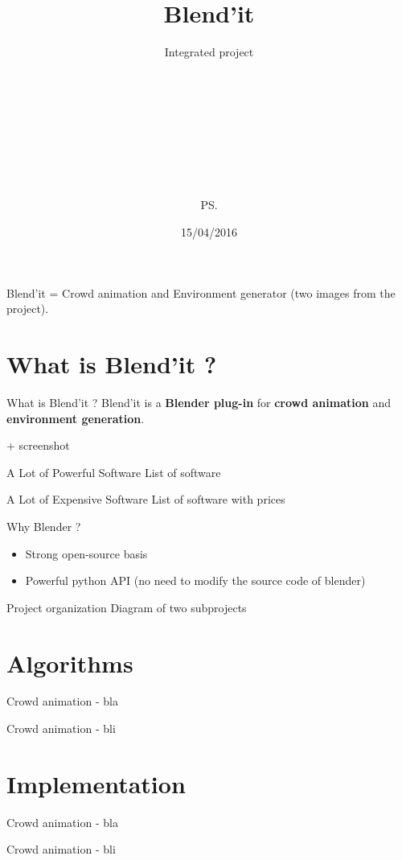 \documentclass{beamer}
\title{Blend'it}
\subtitle{Integrated project}
\author{\bb\\ \gc\\ \dl\\ \vl\\ \om\\ \mr\\ \me\\ \js\\ \ps\\}
\date{15/04/2016}
\begin{document}
\maketitle

\bgroup
{}
\begin{frame}[plain]{}
\end{frame}
\egroup

\begin{frame}{}
  Blend'it = Crowd animation and Environment generator (two images from the project).
\end{frame}

\section{What is Blend'it ?}
\begin{frame}{What is Blend'it ?}
  Blend'it is a \textbf{Blender plug-in} for \textbf{crowd animation} and \textbf{environment generation}.
  
  + screenshot
\end{frame}

\begin{frame}{A Lot of Powerful Software}
  List of software
\end{frame}

\begin{frame}{A Lot of Expensive Software}
  List of software with prices
\end{frame}

\begin{frame}{Why Blender ?}
  \begin{itemize}
    \item Strong open-source basis
    \item Powerful python API (no need to modify the source code of blender)
  \end{itemize}
\end{frame}

\begin{frame}{Project organization}
  Diagram of two subprojects
\end{frame}

\section{Algorithms}
\begin{frame}{Crowd animation - }
  bla
\end{frame}

\begin{frame}{Crowd animation - }
  bli
\end{frame}

\section{Implementation}
\begin{frame}{Crowd animation - }
  bla
\end{frame}

\begin{frame}{Crowd animation - }
  bli
\end{frame}

\bgroup
{}
\begin{frame}[plain]{}
\end{frame}
\egroup
\end{document}
